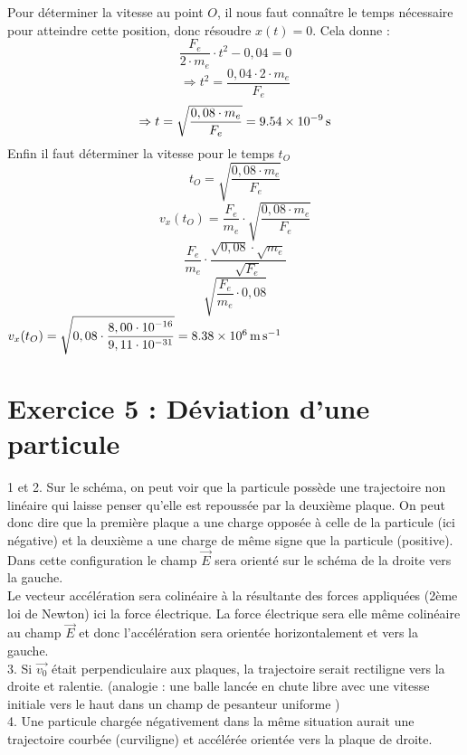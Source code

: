 \documentclass[a4paper,11pt,fleqn]{article}%
\begin{document}
\begin{enumerate}
Pour déterminer la vitesse au point $O$, il nous faut connaître le temps nécessaire pour atteindre cette position, donc résoudre $x(t)=0$. Cela donne : $$\dfrac{F_e}{2 \cdot m_e} \cdot t^2 - 0,04 = 0$$
$$\Rightarrow t^2 = \dfrac{0,04 \cdot 2 \cdot m_e}{F_e}$$
$$\Rightarrow t = \sqrt{\frac{0,08 \cdot m_e}{F_e}} = \SI{9,54E-9}{\second}$$
Enfin il faut déterminer la vitesse pour le temps $t_O$ 
$$t_O = \sqrt{\dfrac{0,08 \cdot m_e}{F_e}}$$
$$v_x(t_O) = \dfrac{F_e}{m_e} \cdot \sqrt{\dfrac{0,08 \cdot m_e}{F_e}}$$
$$\dfrac{F_e}{m_e} \cdot \dfrac{\sqrt{0,08} \cdot \sqrt{m_e}}{\sqrt{F_e}}$$
$$\sqrt{\dfrac{F_e}{m_e} \cdot 0,08}$$
 $v_x(t_O) = \sqrt{0,08 \cdot \dfrac{8,00\cdot 10^{-16}}{9,11 \cdot 10^{-31}}} = \SI{8,38E6}{\meter \per \second}$
\end{enumerate}

\section*{Exercice 5 : Déviation d'une particule}

1 et 2. Sur le schéma, on peut voir que la particule possède une trajectoire non linéaire qui laisse penser qu'elle est repoussée par la deuxième plaque. On peut donc dire que la première plaque a une charge opposée à celle de la particule (ici négative) et la deuxième a une charge de même signe que la particule (positive). Dans cette configuration le champ $\vec{E}$ sera orienté sur le schéma de la droite vers la gauche.\\
Le vecteur accélération sera colinéaire à la résultante des forces appliquées (2ème loi de Newton) ici la force électrique. La force électrique sera elle même colinéaire au champ $\vec{E}$ et donc l'accélération sera orientée horizontalement et vers la gauche.\\

3. Si $\vec{v_0}$ était perpendiculaire aux plaques, la trajectoire serait rectiligne vers la droite et ralentie. (analogie : une balle lancée en chute libre avec une vitesse initiale vers le haut dans un champ de pesanteur uniforme )\\

4. Une particule chargée négativement dans la même situation aurait une trajectoire courbée (curviligne) et accélérée orientée vers la plaque de droite.\\
\end{document}
